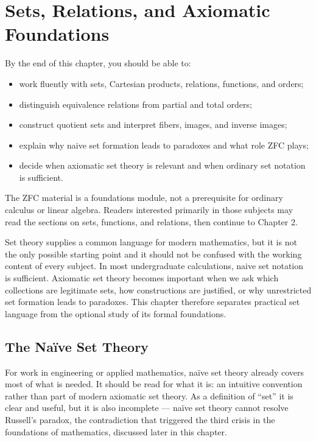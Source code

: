 \chapter{Sets, Relations, and Axiomatic Foundations}
\renewcommand{\thesection}{\arabic{chapter}.\arabic{section}} %

\begin{learningobjectives}
By the end of this chapter, you should be able to:
\begin{itemize}
    \item work fluently with sets, Cartesian products, relations, functions, and orders;
    \item distinguish equivalence relations from partial and total orders;
    \item construct quotient sets and interpret fibers, images, and inverse images;
    \item explain why naive set formation leads to paradoxes and what role ZFC plays;
    \item decide when axiomatic set theory is relevant and when ordinary set notation is sufficient.
\end{itemize}
\end{learningobjectives}

\begin{mynote}
The ZFC material is a foundations module, not a prerequisite for ordinary calculus or linear algebra. Readers interested primarily in those subjects may read the sections on sets, functions, and relations, then continue to Chapter 2.
\end{mynote}

Set theory supplies a common language for modern mathematics, but it is not the only possible starting point and it should not be confused with the working content of every subject. In most undergraduate calculations, naive set notation is sufficient. Axiomatic set theory becomes important when we ask which collections are legitimate sets, how constructions are justified, or why unrestricted set formation leads to paradoxes. This chapter therefore separates practical set language from the optional study of its formal foundations.

\section{The Naïve Set Theory}
For work in engineering or applied mathematics, naïve set theory already covers most of what is needed. It should be read for what it is: an intuitive convention rather than part of modern axiomatic set theory. As a definition of ``set'' it is clear and useful, but it is also incomplete — naïve set theory cannot resolve Russell's paradox, the contradiction that triggered the third crisis in the foundations of mathematics, discussed later in this chapter.

